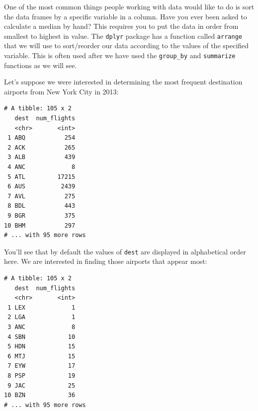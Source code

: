 \documentclass[12pt,]{krantz}
\makeatletter
\newenvironment{Shaded}{\begin{snugshade}}{\end{snugshade}}
\newcommand{\KeywordTok}[1]{\textcolor[rgb]{0.27,0.27,0.27}{\textbf{#1}}}
\newcommand{\DataTypeTok}[1]{\textcolor[rgb]{0.27,0.27,0.27}{#1}}
\newcommand{\StringTok}[1]{\textcolor[rgb]{0.5,0.5,0.5}{#1}}
\newcommand{\OperatorTok}[1]{\textcolor[rgb]{0.43,0.43,0.43}{\textbf{#1}}}
\newcommand{\NormalTok}[1]{#1}
\newenvironment{kframe}{%
\medskip{}
\setlength{\fboxsep}{.8em}
 \def\at@end@of@kframe{}%
 \ifinner\ifhmode%
  \def\at@end@of@kframe{\end{minipage}}%
  \begin{minipage}{\columnwidth}%
 \fi\fi%
 \def\FrameCommand##1{\hskip\@totalleftmargin \hskip-\fboxsep
 \colorbox{shadecolor}{##1}\hskip-\fboxsep
     \hskip-\linewidth \hskip-\@totalleftmargin \hskip\columnwidth}%
 \MakeFramed {\advance\hsize-\width
   \@totalleftmargin\z@ \linewidth\hsize
   \@setminipage}}%
 {\par\unskip\endMakeFramed%
 \at@end@of@kframe}
\renewenvironment{Shaded}{\begin{kframe}}{\end{kframe}}
\makeatother
\begin{document}
One of the most common things people working with data would like to do
is sort the data frames by a specific variable in a column. Have you
ever been asked to calculate a median by hand? This requires you to put
the data in order from smallest to highest in value. The \texttt{dplyr}
package has a function called \texttt{arrange} that we will use to
sort/reorder our data according to the values of the specified variable.
This is often used after we have used the \texttt{group\_by} and
\texttt{summarize} functions as we will see.

Let's suppose we were interested in determining the most frequent
destination airports from New York City in 2013:

\begin{Shaded}
\end{Shaded}

\begin{verbatim}
# A tibble: 105 x 2
   dest  num_flights
   <chr>       <int>
 1 ABQ           254
 2 ACK           265
 3 ALB           439
 4 ANC             8
 5 ATL         17215
 6 AUS          2439
 7 AVL           275
 8 BDL           443
 9 BGR           375
10 BHM           297
# ... with 95 more rows
\end{verbatim}

You'll see that by default the values of \texttt{dest} are displayed in
alphabetical order here. We are interested in finding those airports
that appear most:

\begin{Shaded}
\end{Shaded}

\begin{verbatim}
# A tibble: 105 x 2
   dest  num_flights
   <chr>       <int>
 1 LEX             1
 2 LGA             1
 3 ANC             8
 4 SBN            10
 5 HDN            15
 6 MTJ            15
 7 EYW            17
 8 PSP            19
 9 JAC            25
10 BZN            36
# ... with 95 more rows
\end{verbatim}
\end{document}
